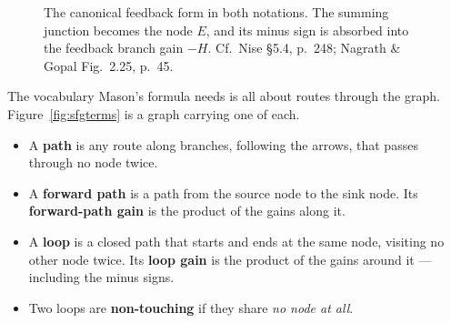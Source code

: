 \documentclass[11pt,a4paper]{article}
\renewcommand{\sumsign}[3]{\node[font=\scriptsize] at ($(#1)+(#2:0.72)$) {$#3$};}
\begin{document}
\begin{figure}[htbp]
\centering
{}
\caption{The canonical feedback form in both notations. The summing junction
becomes the node $E$, and its minus sign is absorbed into the feedback branch
gain $-H$. Cf.\ Nise \S5.4, p.~248; Nagrath \& Gopal Fig.~2.25, p.~45.}
\label{fig:bd2sfg}
\end{figure}

The vocabulary Mason's formula needs is all about routes through the graph.
Figure~\ref{fig:sfgterms} is a graph carrying one of each.

\begin{itemize}[leftmargin=*]
\item A \textbf{path} is any route along branches, following the arrows, that
      passes through no node twice.
\item A \textbf{forward path} is a path from the source node to the sink node.
      Its \textbf{forward-path gain} is the product of the gains along it.
\item A \textbf{loop} is a closed path that starts and ends at the same node,
      visiting no other node twice. Its \textbf{loop gain} is the product of
      the gains around it --- including the minus signs.
\item Two loops are \textbf{non-touching} if they share \emph{no node at all}.
\end{itemize}
\end{document}
